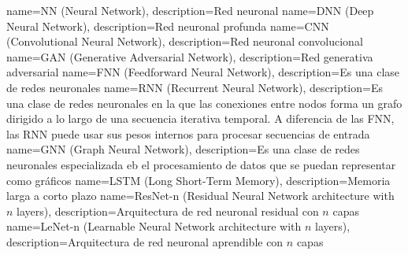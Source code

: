        {name={NN (Neural Network)},                            description={Red neuronal}}
      {name={DNN (Deep Neural Network)},                      description={Red neuronal profunda}}
      {name={CNN (Convolutional Neural Network)},             description={Red neuronal convolucional}}
      {name={GAN (Generative Adversarial Network)},           description={Red generativa adversarial}}
      {name={FNN (Feedforward Neural Network)},               description={Es una clase de redes neuronales}}
      {name={RNN (Recurrent Neural Network)},                 description={Es una clase de redes neuronales en la que las conexiones entre nodos forma un grafo dirigido a lo largo de una secuencia iterativa temporal. A diferencia de las FNN, las RNN puede usar sus pesos internos para procesar secuencias de entrada}}
      {name={GNN (Graph Neural Network)},                 description={Es una clase de redes neuronales especializada eb el procesamiento de datos que se puedan representar como gráficos}}
     {name={LSTM (Long Short-Term Memory)},                  description={Memoria larga a corto plazo}}
 {name={ResNet-n (Residual Neural Network architecture with $n$ layers)},  description={Arquitectura de red neuronal residual con $n$ capas}}
  {name={LeNet-n (Learnable Neural Network architecture with $n$ layers)},  description={Arquitectura de red neuronal aprendible con $n$ capas}}


